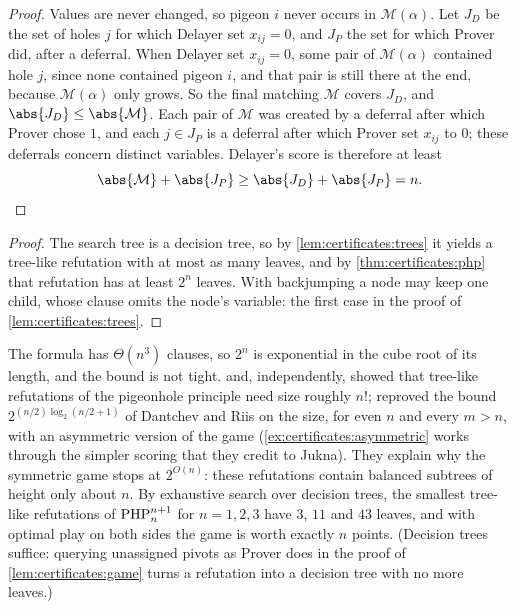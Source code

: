 \begin{refsection}
\begin{proof}
Values are never changed, so pigeon $i$ never occurs in $\mathcal{M}(\alpha)$. Let $J_D$ be the set of holes $j$ for which Delayer set $x_{ij}=0$, and $J_P$ the set for which Prover did, after a deferral. When Delayer set $x_{ij}=0$, some pair of $\mathcal{M}(\alpha)$ contained hole $j$, since none contained pigeon $i$, and that pair is still there at the end, because $\mathcal{M}(\alpha)$ only grows. So the final matching $\mathcal{M}$ covers $J_D$, and $\abs{J_D}\le\abs{\mathcal{M}}$. Each pair of $\mathcal{M}$ was created by a deferral after which Prover chose $1$, and each $j\in J_P$ is a deferral after which Prover set $x_{ij}$ to $0$; these deferrals concern distinct variables. Delayer's score is therefore at least
\[
  \abs{\mathcal{M}}+\abs{J_P}\ge\abs{J_D}+\abs{J_P}=n.\qedhere
\]
\end{proof}


\begin{proof}
The search tree is a decision tree, so by \cref{lem:certificates:trees} it yields a tree-like refutation with at most as many leaves, and by \cref{thm:certificates:php} that refutation has at least $2^n$ leaves. With backjumping a node may keep one child, whose clause omits the node's variable: the first case in the proof of \cref{lem:certificates:trees}.
\end{proof}

The formula has $\Theta(n^3)$ clauses, so $2^n$ is exponential in the cube root of its length, and the bound is not tight. \Textcite{IwamaMiyazaki1999} and, independently, \textcite{DantchevRiis2001} showed that tree-like refutations of the pigeonhole principle need size roughly $n!$; \textcite{BeyersdorffGalesiLauria2010} reproved the bound $2^{(n/2)\log_2(n/2+1)}$ of Dantchev and Riis on the size, for even $n$ and every $m>n$, with an asymmetric version of the game (\cref{ex:certificates:asymmetric} works through the simpler scoring that they credit to Jukna). They explain why the symmetric game stops at $2^{O(n)}$: these refutations contain balanced subtrees of height only about $n$. By exhaustive search over decision trees, the smallest tree-like refutations of $\mathrm{PHP}^{n+1}_{n}$ for $n=1,2,3$ have $3$, $11$ and $43$ leaves, and with optimal play on both sides the game is worth exactly $n$ points. (Decision trees suffice: querying unassigned pivots as Prover does in the proof of \cref{lem:certificates:game} turns a refutation into a decision tree with no more leaves.)


\end{refsection}
